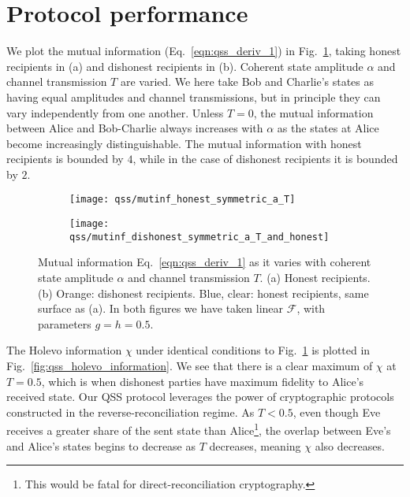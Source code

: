 \section{Protocol performance}\label{sec:qss_performance}


We plot the mutual information (Eq.~\ref{eqn:qss_deriv_1}) in Fig.~\ref{fig:qss_mutual_information}, taking honest recipients in (a) and dishonest recipients in (b). Coherent state amplitude $\alpha$ and channel transmission $T$ are varied. We here take Bob and Charlie's states as having equal amplitudes and channel transmissions, but in principle they can vary independently from one another. Unless $T=0$, the mutual information between Alice and Bob-Charlie always increases with $\alpha$ as the states at Alice become increasingly distinguishable. The mutual information with honest recipients is bounded by $4$, while in the case of dishonest recipients it is bounded by $2$. 

\begin{figure}[htp]
\captionsetup{width=0.8\linewidth}
\centering
	\begin{subfigure}{0.49\linewidth}
	\centering
	\texttt{[image: qss/mutinf\_honest\_symmetric\_a\_T]}
	\caption{}
	\end{subfigure}
	\begin{subfigure}{0.49\linewidth}
	\centering
	\texttt{[image: qss/mutinf\_dishonest\_symmetric\_a\_T\_and\_honest]}
	\caption{}
	\end{subfigure}
\caption{\label{fig:qss_mutual_information} Mutual information Eq.~\ref{eqn:qss_deriv_1} as it varies with coherent state amplitude $\alpha$ and channel transmission $T$. (a) Honest recipients. (b) Orange: dishonest recipients. Blue, clear: honest recipients, same surface as (a). In both figures we have taken linear $\mathcal{F}$, with parameters $g = h = 0.5$.}
\end{figure}

The Holevo information $\chi$ under identical conditions to Fig.~\ref{fig:qss_mutual_information} is plotted in Fig.~\ref{fig:qss_holevo_information}. We see that there is a clear maximum of $\chi$ at $T = 0.5$, which is when dishonest parties have maximum fidelity to Alice's received state. Our QSS protocol leverages the power of cryptographic protocols constructed in the reverse-reconciliation regime. As $T < 0.5$, even though Eve receives a greater share of the sent state than Alice\footnote{This would be fatal for direct-reconciliation cryptography.}, the overlap between Eve's and Alice's states begins to decrease as $T$ decreases, meaning $\chi$ also decreases.

